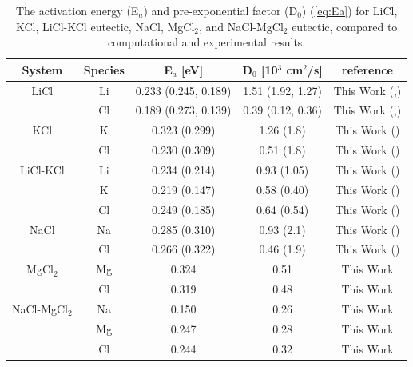 \documentclass[review]{elsarticle}
\begin{document}
\begin{table}[h!]
\centering
\caption{The activation energy (E$_a$) and pre-exponential factor (D$_0$) (\cref{eq:Ea}) for LiCl, KCl, LiCl-KCl eutectic, NaCl, MgCl$_2$, and NaCl-MgCl$_2$ eutectic, compared to computational \cite{Bengston2014} and experimental \cite{janz_Diffusion} results. }
\begin{tabular}{|c|c|c|c|c|}
\hline
System& Species & E$_a$ [eV] & D$_0$ [10$^3$ cm$^2$/s] &reference\\
\hline
LiCl & Li & 0.233 (0.245, 0.189) & 1.51 (1.92, 1.27) & This Work (\cite{Bengston2014},\cite{janz_Diffusion}) \\
     &   Cl  &0.189 (0.273, 0.139) & 0.39 (0.12, 0.36) & This Work (\cite{Bengston2014},\cite{janz_Diffusion}) \\
\hline

KCl & K              &   0.323 (0.299) &    1.26 (1.8)  &   This Work (\cite{janz_Diffusion}) \\
    &Cl             &   0.230 (0.309)  &    0.51 (1.8)  &   This Work (\cite{janz_Diffusion})\\

\hline
LiCl-KCl    &Li    &0.234 (0.214) &   0.93 (1.05)  &    This Work (\cite{Bengston2014})\\
            &K     &0.219 (0.147) &   0.58 (0.40)  &    This Work (\cite{Bengston2014})\\
            &Cl    &0.249 (0.185) &   0.64 (0.54)  &    This Work (\cite{Bengston2014})\\
\hline
NaCl    &Na    &   0.285 (0.310)  &   0.93 (2.1)   &  This Work (\cite{janz_Diffusion})\\
        &Cl    &   0.266 (0.322)  &   0.46 (1.9)   &   This Work (\cite{janz_Diffusion})\\
\hline
MgCl$_2$    &Mg   &   0.324   &   0.51   &   This Work\\
            &Cl    &   0.319   &   0.48    &   This Work\\
\hline
NaCl-MgCl$_2$   &Na    &   0.150   &   0.26    & This Work\\
                &Mg   &   0.247   &   0.28    &   This Work\\
                &Cl    &   0.244   &   0.32    &   This Work\\
\hline
\end{tabular}

\label{table:activation_energy}
\end{table}

\FloatBarrier
\end{document}

